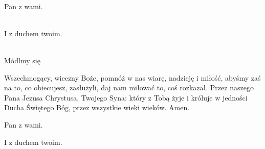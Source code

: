 \newcommand{\dominusvobiscum}{
  \rubric{\Vbar}Pan z wami.
}
\newcommand{\etcumspiritutuo}{
  \rubric{\Rbar}I z duchem twoim.
}

\\
\dominusvobiscum
\\
\etcumspiritutuo
\\
Módlmy się

Wszechmogący, wieczny Boże, pomnóż w nas wiarę, nadzieję i miłość, abyśmy zaś na to, co obiecujesz, zasłużyli, daj nam miłować to, coś rozkazał. Przez naszego Pana Jezusa Chrystusa, Twojego Syna: który z Tobą żyje i króluje w jedności Ducha Świętego Bóg, przez wszystkie wieki wieków. \rubric{\Rbar} Amen.

\dominusvobiscum

\etcumspiritutuo
